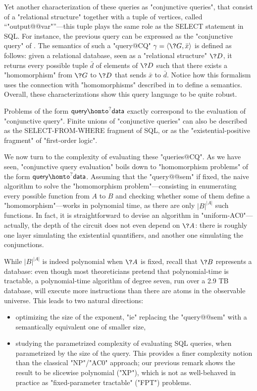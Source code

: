 Yet another characterization of these queries as "conjunctive queries",
that consist of a "relational structure" together with a tuple of vertices, called ``"output@@var"''---this tuple
plays the same role as the \textsf{SELECT} statement in SQL.
For instance, the previous query can be expressed as the "conjunctive query"
of . The semantics of such a "query@CQ"
$\gamma = \tup{\?G, \bar x}$ is defined as follows:
given a relational database, seen as a "relational structure" $\?D$,
it returns every possible tuple $\bar d$ of elements of $\?D$ such that
there exists a "homomorphism" from $\?G$ to $\?D$ that sends $\bar x$ to $\bar d$.
Notice how this formalism uses the connection with "homomorphisms"
described in  to define a semantics.
Overall, these characterizations show this query language to be quite robust.

\begin{known}
	Problems of the form $\textsf{query} \homto^? \textsf{data}$
	exactly correspond to the evaluation of "conjunctive query". 
	Finite unions of "conjunctive queries" can also be described as the
	\textsf{SELECT-FROM-WHERE} fragment of SQL, or as the "existential-positive
	fragment" of "first-order logic".
\end{known}

We now turn to the complexity of evaluating these "queries@CQ".
As we have seen, "conjunctive query evaluation" boils down to
"homomorphism problems" of the form $\textsf{query} \homto^? \textsf{data}$.
Assuming that the "query@@sem" if fixed,
the naive algorithm to solve the "homomorphism problem"---consisting in enumerating
every possible function from $A$ to $B$ and checking whether some of them
define a "homomorphism"---works in polynomial time, as there are only $|B|^{|A|}$ such functions.
In fact, it is straightforward to devise an algorithm in "uniform-AC0"---actually, the depth
of the circuit does not even depend on $\?A$: there is roughly one layer simulating the
existential quantifiers, and another one simulating the conjunctions.

While $|B|^{|A|}$ is indeed polynomial when $\?A$ is fixed,
recall that $\?B$ represents a database:
even though most theoreticians pretend that polynomial-time is tractable,
a polynomial-time algorithm of degree seven,
run over a 2.9 TB database, will execute more instructions
than there are atoms in the observable universe.
This leads to two natural directions:
\begin{itemize}
	\item optimizing the size of the exponent, "ie"
		replacing the "query@@sem" with a semantically equivalent one of smaller size,
	\item studying the parametrized complexity of evaluating SQL queries, when parametrized by
		the size of the query. This provides a finer complexity notion than
		the classical "NP"/"AC0" approach; our previous remark shows the result to be
		slicewise polynomial ("XP"), which is not as well-behaved in practice as
		"fixed-parameter tractable" ("FPT") problems.
\end{itemize}

